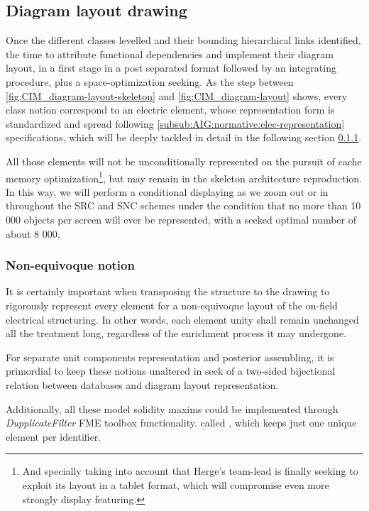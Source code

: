 \subsection{Diagram layout drawing}
\label{sub:AIG:diagram-layout}
Once the different classes levelled and their bounding hierarchical links identified, the time to attribute functional dependencies and implement their diagram layout, in a first stage in a post separated format followed by an integrating procedure, plus a space-optimization seeking. As the step between \autoref{fig:CIM_diagram-layout-skeleton} and \autoref{fig:CIM_diagram-layout} shows, every class notion correspond to an electric element, whose representation form is standardized and spread following \autoref{subsub:AIG:normative:elec-representation} specifications, which will be deeply tackled in detail in the following section \ref{subsub:AIG:diagram-layout:non-eq-notion}. 

All those elements will not be unconditionally represented on the pursuit of cache memory optimization\footnote{And specially taking into account that Herge's team-lead is finally seeking to exploit its layout in a tablet format, which will compromise even more strongly display featuring.}, but may remain in the skeleton architecture reproduction. In this way, we will perform a conditional displaying as we zoom out or in throughout the SRC and SNC schemes under the condition that no more than 10 000 objects per screen will ever be represented, with a seeked optimal number of about 8 000. 

\subsubsection{Non-equivoque notion}
\label{subsub:AIG:diagram-layout:non-eq-notion}

It is certainly important when transposing the structure to the drawing to rigorously represent every element for a non-equivoque layout of the on-field electrical structuring. In other words, each element unity shall remain unchanged all the treatment long, regardless of the enrichment process it may undergone. 

For separate unit components representation and posterior assembling, it is primordial to keep these notions unaltered in seek of a two-sided bijectional relation between databases and diagram layout representation.

Additionally, all these model solidity maxims could be implemented through \textit{DupplicateFilter} FME toolbox functionality. called , which keeps just one unique element per identifier.


